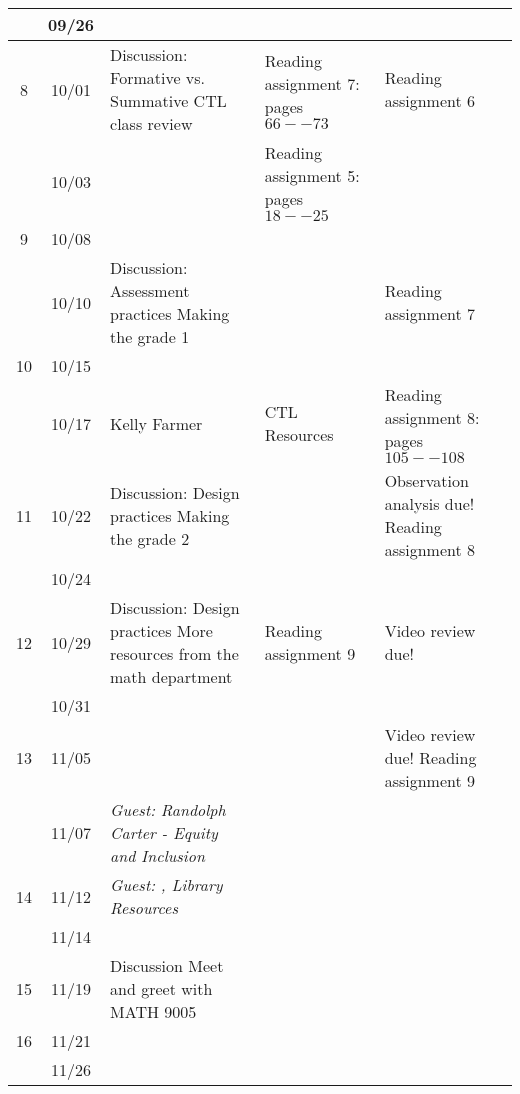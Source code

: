 \begin{longtable}{ |c|c|p{10em}|p{10em}|p{10em}| }
    & 09/26 &  {} & {} & {} \\ \hline

  8 & 10/01 &  {Discussion: Formative vs. Summative CTL class review}  
            & {Reading assignment 7: pages $66--73$} 
            & {Reading assignment 6} \\ \hline

    & 10/03 & {} 
            & {Reading assignment 5: pages $18--25$} & \\ \hline

  9 & 10/08 & 
             &
             & {} \\ \hline

     & 10/10 & {Discussion:  Assessment practices Making the grade 1}   & {}  & {Reading assignment 7} \\ \hline

  10 & 10/15 & {}   & {}  & {} \\ \hline

     & 10/17 & {Kelly Farmer} %
             & {CTL Resources}
             & {Reading assignment 8: pages $105--108$} \\ \hline

  11 & 10/22  & {Discussion:  Design practices Making the grade 2} 
              &  
              & {Observation analysis due! Reading assignment 8} \\ \hline

     & 10/24  & {} &  & {} \\ \hline

  12 & 10/29 &  {Discussion: Design practices More resources from the math department} 
             & {Reading assignment 9}  
             & {Video review due!} \\ \hline

     & 10/31 &  {} & {}  & {} \\ \hline

  13 & 11/05 & {} 
             & 
             & {Video review due! Reading assignment 9} \\ \hline %

     & 11/07 & \textit{Guest: Randolph Carter - Equity and Inclusion} %
             & 
             & {} \\ \hline %

  14 & 11/12 & \textit{Guest: , Library Resources}  %
             & 
             & {} \\ \hline %


     & 11/14 & {}
             & 
             & \\ \hline

     
  15 & 11/19 & {Discussion Meet and greet with MATH 9005} 
             & 
             & \\ \hline

  16 & 11/21 & {} & & \\ \hline

     & 11/26 &  {} & {}  & {} \\ \hline
\end{longtable}

